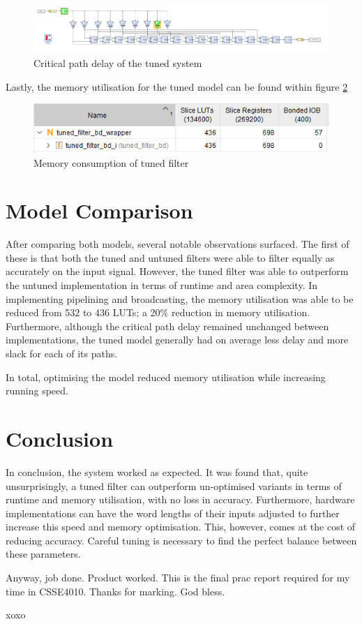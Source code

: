 \documentclass[12pt,a4paper]{article}
\begin{document}
\begin{figure}[H]
    \centering
    \includegraphics[scale=0.25]{images/critical_path_tuned.PNG}
    \caption{Critical path delay of the tuned system}
    \label{fig:critical_path_tuned}
\end{figure}

Lastly, the memory utilisation for the tuned model can be found within figure \ref{fig:tuned_utilisation}

\begin{figure}[H]
    \centering
    \includegraphics[scale=0.25]{images/tuned_utilisation.PNG}
    \caption{Memory consumption of tuned filter}
    \label{fig:tuned_utilisation}
\end{figure}

\section{Model Comparison}

After comparing both models, several notable observations surfaced. The first of these is that both the tuned and untuned filters were able to filter equally as accurately on the input signal. However, the tuned filter was able to outperform the untuned implementation in terms of runtime and area complexity. In implementing pipelining and broadcasting, the memory utilisation was able to be reduced from 532 to 436 LUTs; a 20$\%$ reduction in memory utilisation. Furthermore, although the critical path delay remained unchanged between implementations, the tuned model generally had on average less delay and more slack for each of its paths.

In total, optimising the model reduced memory utilisation while increasing running speed.

\section{Conclusion}

In conclusion, the system worked as expected. It was found that, quite unsurprisingly, a tuned filter can outperform un-optimised variants in terms of runtime and memory utilisation, with no loss in accuracy. Furthermore, hardware implementations can have the word lengths of their inputs adjusted to further increase this speed and memory optimisation. This, however, comes at the cost of reducing accuracy. Careful tuning is necessary to find the perfect balance between these parameters. 

Anyway, job done. Product worked. This is the final prac report required for my time in CSSE4010. Thanks for marking. God bless.

xoxo
\end{document}
